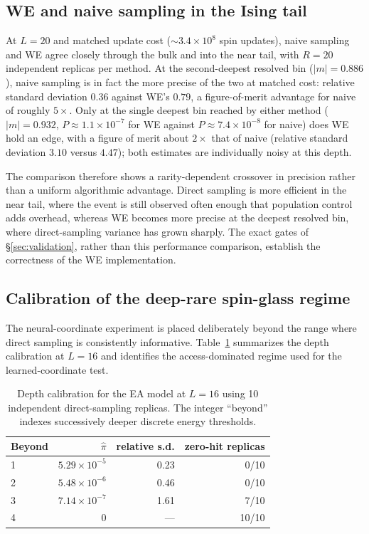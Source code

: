 \documentclass[a4paper,fleqn]{cas-sc}
\begin{document}
\subsection{WE and naive sampling in the Ising tail}\label{sec:tailreach}
At $L=20$ and matched update cost ($\sim3.4\times10^{8}$ spin updates), naive sampling and WE
agree closely through the bulk and into the near tail, with $R=20$ independent replicas per
method. At the second-deepest resolved bin ($|m|=0.886$), naive sampling is in fact the more
precise of the two at matched cost: relative standard deviation $0.36$ against WE's $0.79$, a
figure-of-merit advantage for naive of roughly $5\times$. Only at the single deepest bin
reached by either method ($|m|=0.932$, $P\approx1.1\times10^{-7}$ for WE against
$P\approx7.4\times10^{-8}$ for naive) does WE hold an edge, with a figure of merit about
$2\times$ that of naive (relative standard deviation $3.10$ versus $4.47$); both estimates are
individually noisy at this depth.

The comparison therefore shows a rarity-dependent crossover in precision rather than a
uniform algorithmic advantage. Direct sampling is more efficient in the near tail, where the
event is still observed often enough that population control adds overhead, whereas WE becomes
more precise at the deepest resolved bin, where direct-sampling variance has grown sharply.
The exact gates of \S\ref{sec:validation}, rather than this performance comparison, establish
the correctness of the WE implementation.

\subsection{Calibration of the deep-rare spin-glass regime}\label{sec:depth}
The neural-coordinate experiment is placed deliberately beyond the range where direct sampling
is consistently informative. Table~\ref{tab:depth} summarizes the depth calibration at $L=16$
and identifies the access-dominated regime used for the learned-coordinate test.

\begin{table}[H]
\centering\small
\caption{Depth calibration for the EA model at $L=16$ using 10 independent direct-sampling
replicas. The integer ``beyond'' indexes successively deeper discrete energy thresholds.}
\label{tab:depth}
\begin{tabular}{lrrr}
\toprule
Beyond & $\hat\pi$ & relative s.d. & zero-hit replicas \\
\midrule
1 & $5.29\times10^{-5}$ & 0.23 & 0/10 \\
2 & $5.48\times10^{-6}$ & 0.46 & 0/10 \\
3 & $7.14\times10^{-7}$ & 1.61 & 7/10 \\
4 & $0$ & --- & 10/10 \\
\bottomrule
\end{tabular}
\end{table}
\end{document}

